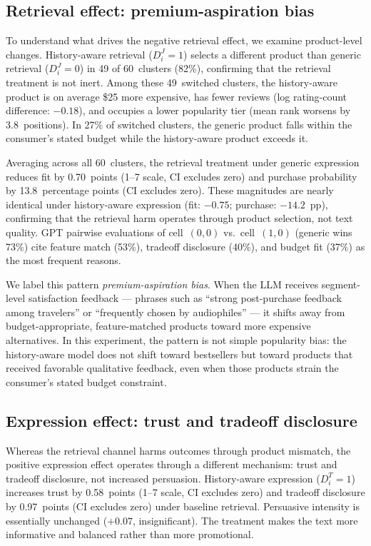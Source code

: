 \documentclass[11pt]{article}
\begin{document}
\subsection{Retrieval effect: premium-aspiration bias}\label{section:retrieval-mechanism}

To understand what drives the negative retrieval effect, we examine product-level changes. History-aware retrieval ($D_i^J = 1$) selects a different product than generic retrieval ($D_i^J = 0$) in 49 of 60~clusters (82\%), confirming that the retrieval treatment is not inert. Among these 49~switched clusters, the history-aware product is on average \$25 more expensive, has fewer reviews (log rating-count difference: $-0.18$), and occupies a lower popularity tier (mean rank worsens by 3.8~positions). In 27\% of switched clusters, the generic product falls within the consumer's stated budget while the history-aware product exceeds it.

Averaging across all 60~clusters, the retrieval treatment under generic expression reduces fit by 0.70~points (1--7 scale, CI excludes zero) and purchase probability by 13.8~percentage points (CI excludes zero). These magnitudes are nearly identical under history-aware expression (fit: $-0.75$; purchase: $-14.2$~pp), confirming that the retrieval harm operates through product selection, not text quality. GPT pairwise evaluations of cell~$(0,0)$ vs.\ cell~$(1,0)$ (generic wins 73\%) cite feature match (53\%), tradeoff disclosure (40\%), and budget fit (37\%) as the most frequent reasons.

We label this pattern \emph{premium-aspiration bias}. When the LLM receives segment-level satisfaction feedback --- phrases such as ``strong post-purchase feedback among travelers'' or ``frequently chosen by audiophiles'' --- it shifts away from budget-appropriate, feature-matched products toward more expensive alternatives. In this experiment, the pattern is not simple popularity bias: the history-aware model does not shift toward bestsellers but toward products that received favorable qualitative feedback, even when those products strain the consumer's stated budget constraint.

\subsection{Expression effect: trust and tradeoff disclosure}\label{section:expression-mechanism}

Whereas the retrieval channel harms outcomes through product mismatch, the positive expression effect operates through a different mechanism: trust and tradeoff disclosure, not increased persuasion. History-aware expression ($D_i^T = 1$) increases trust by 0.58~points (1--7 scale, CI excludes zero) and tradeoff disclosure by 0.97~points (CI excludes zero) under baseline retrieval. Persuasive intensity is essentially unchanged ($+0.07$, insignificant). The treatment makes the text more informative and balanced rather than more promotional.
\end{document}
